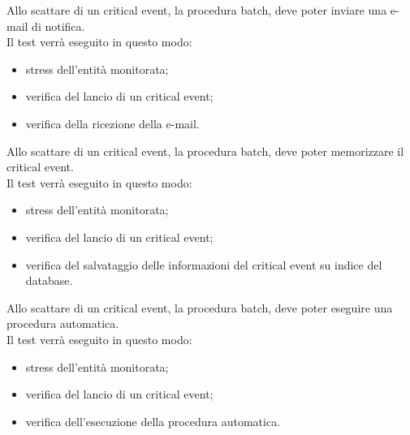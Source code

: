 		 Allo scattare di un critical event, la procedura batch, deve poter inviare una e-mail di notifica. \\
		Il test verrà eseguito in questo modo:		
		\begin{itemize}
			\item stress dell'entità monitorata;
			\item verifica del lancio di un critical event;
			\item verifica della ricezione della e-mail.
		\end{itemize}

		 Allo scattare di un critical event, la procedura batch, deve poter memorizzare il critical event. \\
		Il test verrà eseguito in questo modo:		
		\begin{itemize}
			\item stress dell'entità monitorata;
			\item verifica del lancio di un critical event;
			\item verifica del salvataggio delle informazioni del critical event su indice del database.
		\end{itemize}

		 Allo scattare di un critical event, la procedura batch, deve poter eseguire una procedura automatica. \\
		Il test verrà eseguito in questo modo:		
		\begin{itemize}
			\item stress dell'entità monitorata;
			\item verifica del lancio di un critical event;
			\item verifica dell'esecuzione della procedura automatica.
		\end{itemize}
